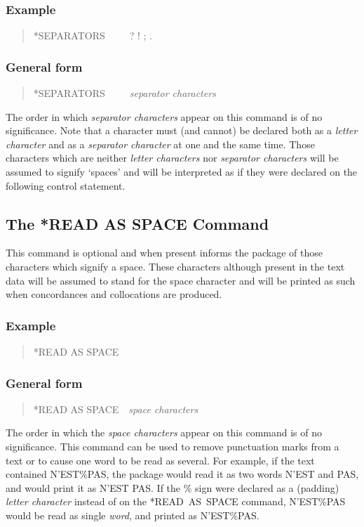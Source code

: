 \subsubsection{Example}
\begin{quote}
*SEPARATORS~~~~~? ! ; .
\end{quote}

\subsubsection{General form}
\begin{quote}
*SEPARATORS~~~~~{\em separator characters}
\end{quote}

The order in which {\em separator characters} appear on this command
is of no significance.  Note that a character must (and cannot) be declared
both as a {\em letter character} and as a {\em separator character} at one and
the same time.  Those characters which are neither {\em letter characters} nor
{\em separator characters} will be assumed to signify `spaces' and will be
interpreted as if they were declared on the following control statement.

\subsection{The *READ AS SPACE Command}
This command is optional and when present informs the package of
those characters which signify a space.  These characters although
present in the text data will be assumed to stand for the space
character and will be printed as such when concordances and collocations
are produced.

\subsubsection{Example}
\begin{quote}
*READ AS SPACE~~%
\end{quote}

\subsubsection{General form}
\begin{quote}
*READ AS SPACE~~{\em space characters}
\end{quote}

The order in which the {\em space characters} appear on this command is
of no significance.  This command can be used to remove punctuation
marks from a text or to cause one word to be read as several.  For
example, if the text contained N'EST\%PAS, the package would read it as
two words N'EST and PAS, and would print it as N'EST PAS.  If the \% sign
were declared as a (padding) {\em letter character} instead of on the
*READ~AS~SPACE command, N'EST\%PAS would be read as single {\em word}, and
printed as N'EST\%PAS.

